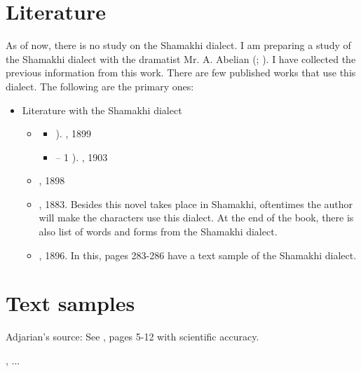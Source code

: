 \section{Literature}

As of now, there is no study on the Shamakhi dialect. I am preparing a study of the Shamakhi dialect with the dramatist Mr. A. Abelian (; ). I have collected the previous information from this work. There are few published works that use this dialect. The following are the primary ones:


{\litoverview}

\begin{itemize}
	\item Literature with the Shamakhi dialect
	\begin{itemize}
		\item {} 
		\begin{itemize}
			\item {}). , 1899
			\item –  1 ). , 1903
		\end{itemize}
		\item {}, 1898
		\item {}, 1883. Besides this novel takes place in Shamakhi, oftentimes the author will make the characters use this dialect. At the end of the book, there is also list of words and forms from the Shamakhi dialect. 
		\item {}, 1896. In this, pages 283-286 have a text sample of the Shamakhi dialect. 
		
	\end{itemize}
\end{itemize}

\section{Text samples}

{\sampleoverview}

Adjarian's source: See , pages 5-12 with scientific accuracy. 

, ... 


